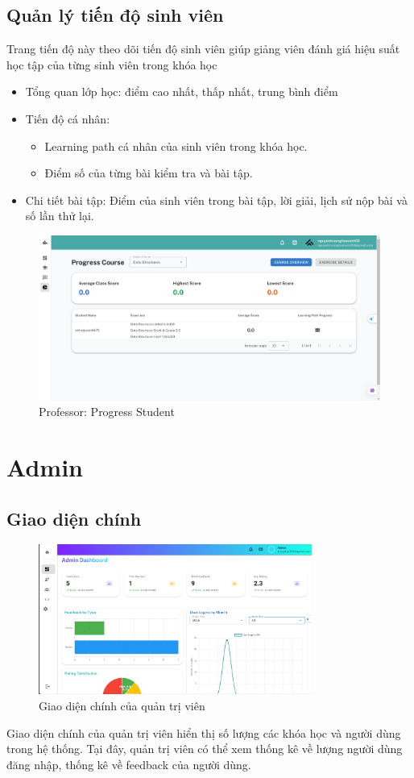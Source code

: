 \subsection{Quản lý tiến độ sinh viên}
Trang tiến độ này theo dõi tiến độ sinh viên giúp giảng viên đánh giá hiệu suất học tập của từng sinh viên trong khóa học
\begin{itemize}
    \item Tổng quan lớp học: điểm cao nhất, thấp nhất, trung bình điểm
    \item Tiến độ cá nhân: 
    \begin{itemize}
        \item Learning path cá nhân của sinh viên trong khóa học.
        \item Điểm số của từng bài kiểm tra và bài tập.
    \end{itemize}
    \item Chi tiết bài tập: Điểm của sinh viên trong bài tập, lời giải, lịch sử nộp bài và số lần thử lại.
\end{itemize}
 \begin{figure}[H]
        \centering
        \includegraphics[width=0.8\linewidth]{images/progress_professor.png}
        \caption{Professor: Progress Student}
        \label{fig:progress_professor}
    \end{figure}
\section{Admin}
\subsection{Giao diện chính}
\begin{figure}[H]
    \centering
    \includegraphics[width=0.8\textwidth]{images/CapScreen_Admin/dashboard.png}
    \caption{Giao diện chính của quản trị viên}
    \label{fig:admin_home_page}
\end{figure}
Giao diện chính của quản trị viên hiển thị số lượng các khóa học và người dùng trong hệ thống. Tại đây, quản trị viên có thể xem thống kê về lượng người dùng đăng nhập, thống kê về feedback của người dùng.
